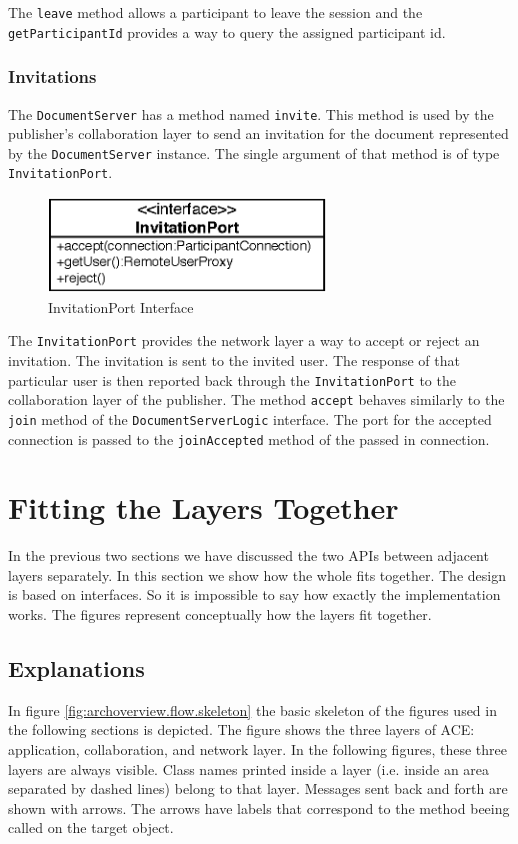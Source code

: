 The \texttt{leave} method allows a participant to leave the session and
the \texttt{get\-Participant\-Id} provides a way to query the assigned
participant id.


\subsubsection{Invitations}
\label{archoverview.net.invite}
The \texttt{Document\-Server} has a method named \texttt{invite}. This method
is used by the publisher's collaboration layer to send an invitation for the
document represented by the \texttt{Document\-Server} instance. The single
argument of that method is of type \texttt{Invitation\-Port}.

\begin{figure}[H]
 \centering
 \includegraphics[width=7.37cm,height=2.54cm]{../images/finalreport/architecture_invitationport_uml.eps}
 \caption{InvitationPort Interface}
\end{figure}

The \texttt{Invitation\-Port} provides the network layer a way to accept or
reject an invitation. The invitation is sent to the invited user. The response
of that particular user is then reported back through the 
\texttt{Invitation\-Port} to the collaboration layer of the publisher. The
method \texttt{accept} behaves similarly to the \texttt{join} method of
the \texttt{Document\-Server\-Logic} interface. The port for the accepted 
connection is passed to the \texttt{join\-Accepted} method of the passed
in connection.



\section{Fitting the Layers Together}
In the previous two sections we have discussed the two APIs between adjacent
layers separately. In this section we show how the whole fits together.
The design is based on 
interfaces. So it is impossible to say how exactly the implementation works. 
The figures represent conceptually how the layers fit together. 


\subsection{Explanations}
In figure \ref{fig:archoverview.flow.skeleton} the basic skeleton of the
figures used in the following sections is depicted. The figure shows the
three layers of ACE: application, collaboration, and network layer. In 
the following figures, these three layers are always visible. Class names
printed inside a layer (i.e. inside an area separated by dashed lines)
belong to that layer. Messages sent back and forth are shown with arrows. The
arrows have labels that correspond to the method beeing called on the target
object.

